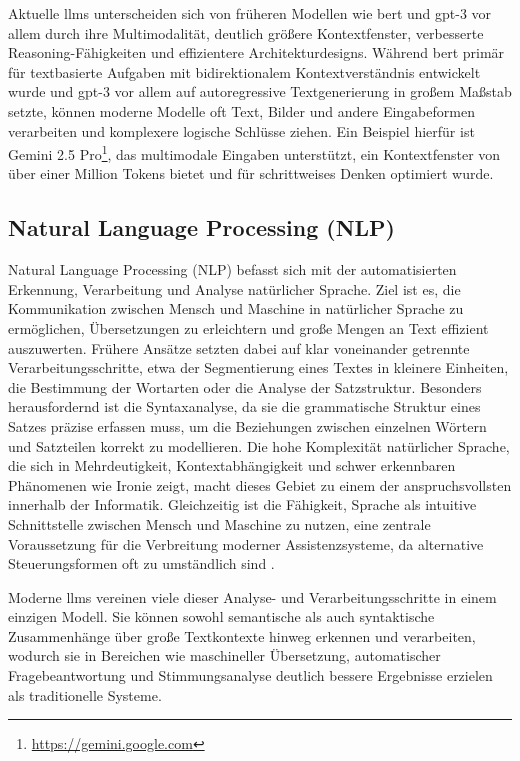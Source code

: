 Aktuelle \glspl{llm} unterscheiden sich von früheren Modellen wie \gls{bert} und \gls{gpt}-3 vor allem durch ihre Multimodalität, deutlich größere Kontextfenster, verbesserte Reasoning-Fähigkeiten und effizientere Architekturdesigns.
Während \gls{bert} primär für textbasierte Aufgaben mit bidirektionalem Kontextverständnis entwickelt wurde und \gls{gpt}-3 vor allem auf autoregressive Textgenerierung in großem Maßstab setzte, können moderne Modelle oft Text, Bilder und andere Eingabeformen verarbeiten und komplexere logische Schlüsse ziehen.
Ein Beispiel hierfür ist Gemini 2.5 Pro\footnote{\url{https://gemini.google.com}}, das multimodale Eingaben unterstützt, ein Kontextfenster von über einer Million Tokens bietet und für schrittweises Denken optimiert wurde.

\subsection{Natural Language Processing (NLP)}

Natural Language Processing (NLP) befasst sich mit der automatisierten Erkennung, Verarbeitung und Analyse natürlicher Sprache.
Ziel ist es, die Kommunikation zwischen Mensch und Maschine in natürlicher Sprache zu ermöglichen, Übersetzungen zu erleichtern und große Mengen an Text effizient auszuwerten.
Frühere Ansätze setzten dabei auf klar voneinander getrennte Verarbeitungsschritte, etwa der Segmentierung eines Textes in kleinere Einheiten, die Bestimmung der Wortarten oder die Analyse der Satzstruktur.
Besonders herausfordernd ist die Syntaxanalyse, da sie die grammatische Struktur eines Satzes präzise erfassen muss, um die Beziehungen zwischen einzelnen Wörtern und Satzteilen korrekt zu modellieren.
Die hohe Komplexität natürlicher Sprache, die sich in Mehrdeutigkeit, Kontextabhängigkeit und schwer erkennbaren Phänomenen wie Ironie zeigt, macht dieses Gebiet zu einem der anspruchsvollsten innerhalb der Informatik.
Gleichzeitig ist die Fähigkeit, Sprache als intuitive Schnittstelle zwischen Mensch und Maschine zu nutzen, eine zentrale Voraussetzung für die Verbreitung moderner Assistenzsysteme, da alternative Steuerungsformen oft zu umständlich sind \autocite{grigoleit_natural_2019}.

Moderne \glspl{llm} vereinen viele dieser Analyse- und Verarbeitungsschritte in einem einzigen Modell.
Sie können sowohl semantische als auch syntaktische Zusammenhänge über große Textkontexte hinweg erkennen und verarbeiten, wodurch sie in Bereichen wie maschineller Übersetzung, automatischer Fragebeantwortung und Stimmungsanalyse deutlich bessere Ergebnisse erzielen als traditionelle Systeme.

